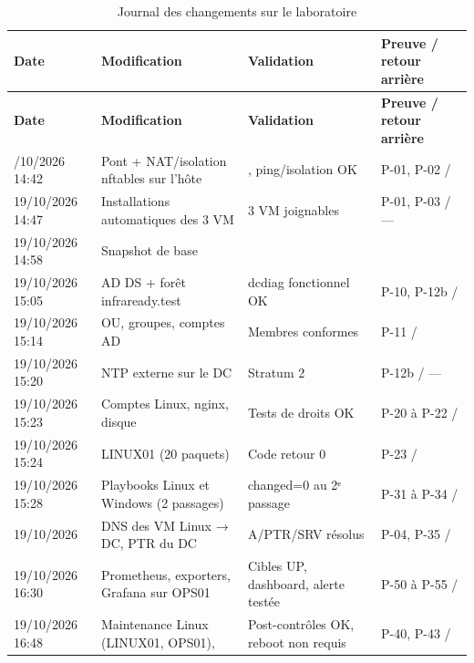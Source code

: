 \begin{longtable}{@{}P{2cm}P{6.3cm}P{3.4cm}P{2.6cm}@{}}
\caption{Journal des changements sur le laboratoire}\label{tab:journal}\\
\toprule \textbf{Date} & \textbf{Modification} & \textbf{Validation} & \textbf{Preuve / retour arrière} \\ \midrule \endfirsthead
\toprule \textbf{Date} & \textbf{Modification} & \textbf{Validation} & \textbf{Preuve / retour arrière} \\ \midrule \endhead
\bottomrule {}/10/2026 14:42 & Pont  + NAT/isolation nftables sur l'hôte & , ping/isolation OK & {\small P-01, P-02 / } \\
19/10/2026 14:47 & Installations automatiques des 3 VM & 3 VM joignables & {\small P-01, P-03 / —} \\
19/10/2026 14:58 & Snapshot de base &  & {\small {}} \\
19/10/2026 15:05 & AD DS + forêt infraready.test & dcdiag fonctionnel OK & {\small P-10, P-12b / } \\
19/10/2026 15:14 & OU, groupes, comptes AD & Membres conformes & {\small P-11 / } \\
19/10/2026 15:20 & NTP externe sur le DC & Stratum 2 & {\small P-12b / —} \\
19/10/2026 15:23 & Comptes Linux, nginx, disque  & Tests de droits OK & {\small P-20 à P-22 / } \\
19/10/2026 15:24 &  LINUX01 (20 paquets) & Code retour 0 & {\small P-23 / } \\
19/10/2026 15:28 & Playbooks Linux et Windows (2 passages) & changed=0 au 2ᵉ passage & {\small P-31 à P-34 / } \\
19/10/2026 & DNS des VM Linux → DC, PTR du DC & A/PTR/SRV résolus & {\small P-04, P-35 / } \\
19/10/2026 16:30 & Prometheus, exporters, Grafana sur OPS01 & Cibles UP, dashboard, alerte testée & {\small P-50 à P-55 / } \\
19/10/2026 16:48 & Maintenance Linux (LINUX01, OPS01),  & Post-contrôles OK, reboot non requis & {\small P-40, P-43 / } \\

\end{longtable}
